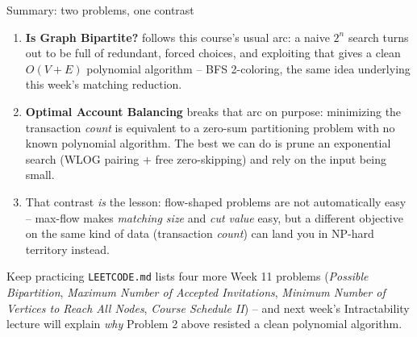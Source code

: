 \documentclass[11pt,aspectratio=169]{beamer}
\begin{document}
\begin{frame}{Summary: two problems, one contrast}
  \footnotesize
  \begin{enumerate}
    \item \textbf{Is Graph Bipartite?} follows this course's usual arc: a naive
    $2^n$ search turns out to be full of redundant, forced choices, and exploiting
    that gives a clean $O(V+E)$ polynomial algorithm -- BFS 2-coloring, the same idea
    underlying this week's matching reduction.
    \item \textbf{Optimal Account Balancing} breaks that arc on purpose: minimizing the
    transaction \emph{count} is equivalent to a zero-sum partitioning problem with no
    known polynomial algorithm. The best we can do is prune an exponential search
    (WLOG pairing + free zero-skipping) and rely on the input being small.
    \item That contrast \emph{is} the lesson: flow-shaped problems are not
    automatically easy -- max-flow makes \emph{matching size} and \emph{cut value}
    easy, but a different objective on the same kind of data (transaction
    \emph{count}) can land you in NP-hard territory instead.
  \end{enumerate}
  \begin{alertblock}{Keep practicing}
    \texttt{LEETCODE.md} lists four more Week 11 problems (\emph{Possible
    Bipartition}, \emph{Maximum Number of Accepted Invitations}, \emph{Minimum Number
    of Vertices to Reach All Nodes}, \emph{Course Schedule II}) -- and next week's
    Intractability lecture will explain \emph{why} Problem 2 above resisted a clean
    polynomial algorithm.
  \end{alertblock}
\end{frame}
\end{document}
